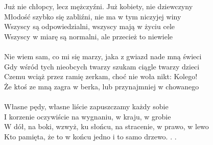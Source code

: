 \documentclass[a5paper, 10pt]{book}
\begin{document}
\begin{minipage}[t]{0.85\textwidth}
  Już nie chłopcy, lecz mężczyźni. Już kobiety, nie dziewczyny\\
  Młodość szybko się zabliźni, nie ma w tym niczyjej winy\\
  Wszyscy są odpowiedzialni, wszyscy mają w życiu cele\\
  Wszyscy w miarę są normalni, ale przecież to niewiele \\
  \\
  Nie wiem sam, co mi się marzy, jaka z gwiazd nade mną świeci\\
  Gdy wśród tych nieobcych twarzy szukam ciągle twarzy dzieci\\
  Czemu wciąż przez ramię zerkam, choć nie woła nikt: Kolego!\\
  Że ktoś ze mną zagra w berka, lub przynajmniej w chowanego \\
  \\
  Własne pędy, własne liście zapuszczamy każdy sobie\\
  I korzenie oczywiście na wygnaniu, w kraju, w grobie\\
  W dół, na boki, wzwyż, ku słońcu, na stracenie, w prawo, w lewo\\
  Kto pamięta, że to w końcu jedno i to samo drzewo. . . \\
\end{minipage}
\end{document}
